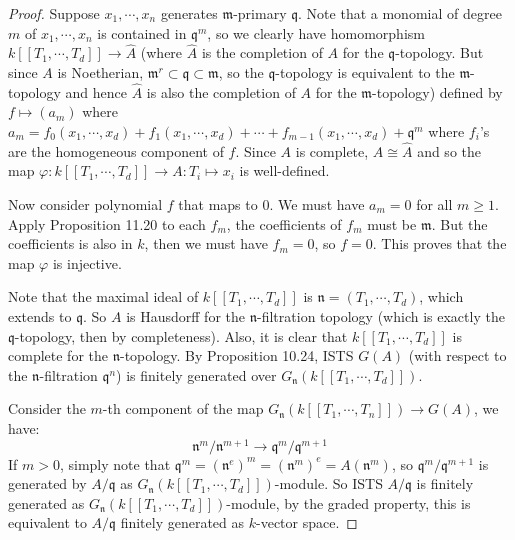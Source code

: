 \documentclass{solution}
\begin{document}
\begin{proof}
    Suppose $x_1, \cdots, x_n$ generates $\mathfrak{m}$-primary $\mathfrak{q}$. Note that a monomial of degree $m$ of $x_1, \cdots, x_n$ is contained in $\mathfrak{q}^m$, so we clearly have homomorphism $k[[T_1, \cdots, T_d]] \rightarrow \hat{A}$ (where $\hat{A}$ is the completion of $A$ for the $\mathfrak{q}$-topology. But since $A$ is Noetherian, $\mathfrak{m}^r \subset \mathfrak{q} \subset \mathfrak{m}$, so the $\mathfrak{q}$-topology is equivalent to the $\mathfrak{m}$-topology and hence $\hat{A}$ is also the completion of $A$ for the $\mathfrak{m}$-topology) defined by $f \mapsto (a_m)$ where $a_m = f_0(x_1, \cdots, x_d) + f_1(x_1, \cdots, x_d) + \cdots + f_{m - 1}(x_1, \cdots, x_d) + \mathfrak{q}^{m}$ where $f_i$'s are the homogeneous component of $f$. Since $A$ is complete, $A \cong \hat{A}$ and so the map $\varphi: k[[T_1, \cdots, T_d]] \rightarrow A: T_i \mapsto x_i$ is well-defined.

    Now consider polynomial $f$ that maps to $0$. We must have $a_m = 0$ for all $m \ge 1$. Apply Proposition 11.20 to each $f_{m}$, the coefficients of $f_m$ must be $\mathfrak{m}$. But the coefficients is also in $k$, then we must have $f_m = 0$, so $f = 0$. This proves that the map $\varphi$ is injective.

    Note that the maximal ideal of $k[[T_1, \cdots, T_d]]$ is $\mathfrak{n} = (T_1, \cdots, T_d)$, which extends to $\mathfrak{q}$. So $A$ is Hausdorff for the $\mathfrak{n}$-filtration topology (which is exactly the $\mathfrak{q}$-topology, then by completeness). Also, it is clear that $k[[T_1, \cdots, T_d]]$ is complete for the $\mathfrak{n}$-topology. By Proposition 10.24, ISTS $G(A)$ (with respect to the $\mathfrak{n}$-filtration $\mathfrak{q}^n$) is finitely generated over $G_{\mathfrak{n}}(k[[T_1, \cdots, T_d]])$.
    
    Consider the $m$-th component of the map $G_{\mathfrak{n}}(k[[T_1, \cdots, T_n]]) \rightarrow G(A)$, we have:
    $$\mathfrak{n}^m / \mathfrak{n}^{m + 1} \rightarrow \mathfrak{q}^m / \mathfrak{q}^{m + 1}$$
    If $m \gt 0$, simply note that $\mathfrak{q}^m = (\mathfrak{n}^e)^m = (\mathfrak{n}^m)^e = A (\mathfrak{n}^m)$, so $\mathfrak{q}^m / \mathfrak{q}^{m + 1}$ is generated by $A / \mathfrak{q}$ as $G_{\mathfrak{n}}(k[[T_1, \cdots, T_d]])$-module. So ISTS $A / \mathfrak{q}$ is finitely generated as $G_{\mathfrak{n}}(k[[T_1, \cdots, T_d]])$-module, by the graded property, this is equivalent to $A / \mathfrak{q}$ finitely generated as $k$-vector space.


\end{proof}
\end{document}
